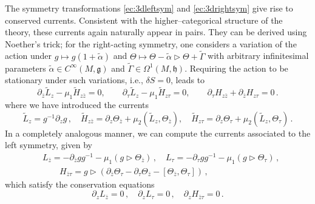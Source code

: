 \documentclass[11pt]{amsart}
\newcommand{\tL}{{\tilde L}}
\newcommand{\fg}{\mathfrak{g}}
\newcommand{\fh}{\mathfrak{h}}
\numberwithin{equation}{section}
\numberwithin{figure}{section}
\numberwithin{table}{section}
\theoremstyle{thm}
\numberwithin{equation}{subsection}
\theoremstyle{definition}
\theoremstyle{rem}
\begin{document}
The symmetry transformations \eqref{ec:3dleftsym} and \eqref{ec:3drightsym} 
give rise to conserved currents. Consistent with the higher--categorical 
structure of the theory, these currents again naturally appear in pairs. They can be 
derived using Noether’s trick; for the right-acting symmetry, one considers a variation of the action under $g \mapsto g(1 + \tilde\alpha) $ and $\Theta \mapsto \Theta - \tilde\alpha \rhd \Theta + \tilde\Gamma$ with arbitrary infinitesimal parameters \( \tilde\alpha \in C^\infty(M, \fg) \) and \( \tilde\Gamma \in \Omega^1(M, \fh) \). Requiring the action to be stationary under such variations, i.e., \( \delta S = 0 \), leads to 
\begin{equation}
\label{ec:conservationeq1}
     \partial_{\bar z}\tilde L_z -\mu_1\tilde H_{z{\bar z}}=0,\qquad \partial_{\tau}\tilde L
     _z-\mu_1\tilde H_{z\tau}=0,\qquad \partial_\tau H_{z\bar z} + \partial_{\bar z}H_{z\tau }=0\,.
\end{equation}
where we have introduced the currents
\begin{equation}
    \tilde L_z = g^{-1}\partial_z g \,,\quad \tilde H_{z{\bar z}} = \partial_z\Theta_{\bar z} + \mu_2(\tL_z,\Theta_{\bar z}),\quad \tilde H_{z\tau} =\partial_z\Theta_\tau+\mu_2(\tL_z,\Theta_\tau) \,.
\end{equation}
In a completely analogous manner, we can compute the currents associated to the left symmetry, given by
\begin{equation}
    \begin{aligned}
      &L_{\bar z} = -\partial_{\bar z}gg^{-1}-\mu_1(g\rhd \Theta_{\bar z})\,,\quad L_\tau = -\partial_\tau gg^{-1}-\mu_1(g\rhd \Theta_\tau)
      \,,\\
      &\qquad H_{{\bar z}\tau} = g\rhd (\partial_{\bar z}\Theta_\tau-\partial_\tau\Theta_{\bar z}-[\Theta_{\bar z},\Theta_\tau]) \,,
\end{aligned}
\end{equation}
which satisfy the conservation equations
\begin{equation}
\label{ec:conservationeq2}
    \partial_z L_{\bar z} = 0\,,\quad \partial_zL_\tau=0\,,\quad \partial_zH_{\bar z\tau} = 0\,.
\end{equation}
\end{document}
